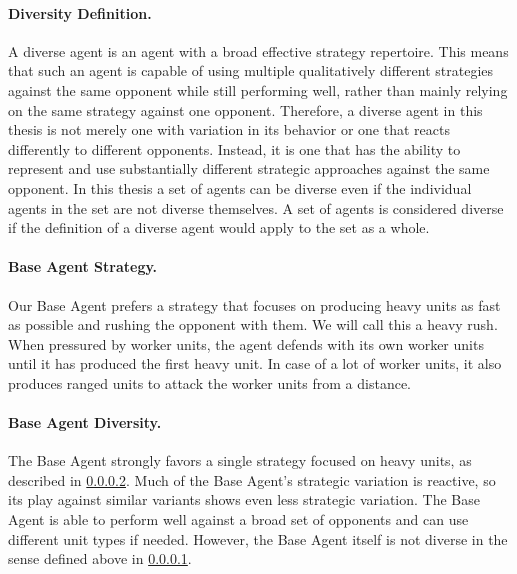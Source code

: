 \documentclass[10pt,twocolumn,letterpaper]{article}
\begin{document}
\paragraph{Diversity Definition.}
\label{par:diverse_agent_definition}
A diverse agent is an agent with a broad effective strategy repertoire.
This means that such an agent is capable of using multiple qualitatively different strategies against the same opponent while still performing well, rather than mainly relying on the same strategy against one opponent.
Therefore, a diverse agent in this thesis is not merely one with variation in its behavior or one that reacts differently to different opponents.
Instead, it is one that has the ability to represent and use substantially different strategic approaches against the same opponent.
\break\break
In this thesis a set of agents can be diverse even if the individual agents in the set are not diverse themselves.
A set of agents is considered diverse if the definition of a diverse agent would apply to the set as a whole.


\paragraph{Base Agent Strategy.}
\label{par:base_agent_strategy}
Our Base Agent prefers a strategy that focuses on producing heavy units as fast as possible and rushing the opponent with them.
We will call this a heavy rush.
When pressured by worker units, the agent defends with its own worker units until it has produced the first heavy unit.
In case of a lot of worker units, it also produces ranged units to attack the worker units from a distance.


\paragraph{Base Agent Diversity.}
\label{par:limited_base_agent_diversity}
The Base Agent strongly favors a single strategy focused on heavy units, as described in \ref{par:base_agent_strategy}.
Much of the Base Agent's strategic variation is reactive, so its play against similar variants shows even less strategic variation.
The Base Agent is able to perform well against a broad set of opponents and can use different unit types if needed.
However, the Base Agent itself is not diverse in the sense defined above in \ref{par:diverse_agent_definition}.
\end{document}
